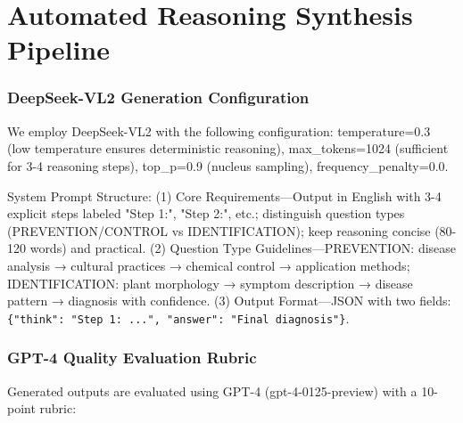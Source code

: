 \documentclass[11pt]{article}
\begin{document}


\appendix

\section{Automated Reasoning Synthesis Pipeline}
\label{sec:appendix_reasoning}

\subsubsection{DeepSeek-VL2 Generation Configuration}

\noindent We employ DeepSeek-VL2 with the following configuration: temperature=0.3 (low temperature ensures deterministic reasoning), max\_tokens=1024 (sufficient for 3-4 reasoning steps), top\_p=0.9 (nucleus sampling), frequency\_penalty=0.0.

\noindent System Prompt Structure: (1) Core Requirements—Output in English with 3-4 explicit steps labeled "Step 1:", "Step 2:", etc.; distinguish question types (PREVENTION/CONTROL vs IDENTIFICATION); keep reasoning concise (80-120 words) and practical. (2) Question Type Guidelines—PREVENTION: disease analysis → cultural practices → chemical control → application methods; IDENTIFICATION: plant morphology → symptom description → disease pattern → diagnosis with confidence. (3) Output Format—JSON with two fields: \texttt{\{"think": "Step 1: ...", "answer": "Final diagnosis"\}}.

\subsubsection{GPT-4 Quality Evaluation Rubric}

\noindent Generated outputs are evaluated using GPT-4 (gpt-4-0125-preview) with a 10-point rubric:
\end{document}

